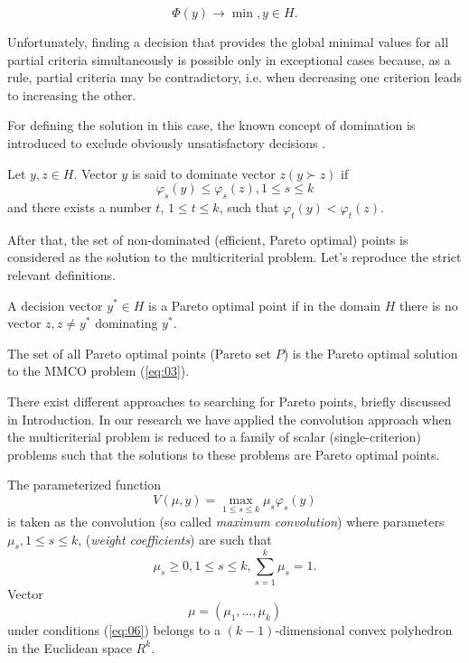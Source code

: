 \documentclass[runningheads]{llncs}
\begin{document}
\begin{equation}
\label{eq:03}
    \Phi(y) \to \min, y \in H.
\end{equation}

Unfortunately, finding a decision that provides the global minimal values for all partial criteria simultaneously is possible only in exceptional cases because, as a rule, partial criteria may be contradictory, i.e. when decreasing one criterion leads to increasing the other.

For defining the solution in this case, the known concept of domination is introduced to exclude obviously unsatisfactory decisions \cite{Pardalos2017,Marler2009}.
\begin{definition}
Let $y, z \in H$. Vector $y$ is said to dominate vector $z (y \succ z)$ if  
\begin{equation}
    \label{eq:04}
    \varphi_s(y) \leq \varphi_s(z), 1 \leq s \leq k
\end{equation}
and there exists a number $t$, $1 \leq t \leq k$, such that $\varphi_t(y) < \varphi_t(z)$.
\end{definition}

After that, the set of non-dominated (efficient, Pareto optimal) points is considered as the solution to the multicriterial problem. Let's reproduce the strict relevant definitions.
\begin{definition}
A decision vector $y^* \in H$ is a Pareto optimal point if in the domain $H$ there is no vector $z, z\neq y^*$ dominating $y^*$.
\end{definition}
\begin{definition}
The set of all Pareto optimal points (Pareto set $P$) is the Pareto optimal solution to the MMCO problem (\ref{eq:03}).
\end{definition}


There exist different approaches to searching for Pareto points, briefly discussed in Introduction. In our research we have applied the convolution approach when the multicriterial problem is reduced to a family of scalar (single-criterion) problems such that the solutions to these problems are Pareto optimal points.

The parameterized function
\begin{equation}
    \label{eq:05}
    V(\mu, y) = \max_{1 \leq s \leq k} \mu_s \varphi_s(y)
\end{equation}
is taken as the convolution (so called \textit{maximum convolution}) where parameters $\mu_s, 1 \leq s \leq k$, (\textit{weight coefficients}) are such that 
\begin{equation}
    \label{eq:06}
    \mu_s \geq 0, 1 \leq s \leq k, \sum_{s=1}^k \mu_s=1.
\end{equation}
Vector
\begin{equation}
    \label{eq:06a}
    \mu = (\mu_1, \dots, \mu_k) 
\end{equation}
under conditions (\ref{eq:06}) belongs to a $(k-1)$-dimensional convex polyhedron in the Euclidean space  $R^k$.
\end{document}
